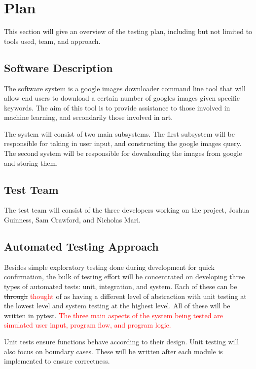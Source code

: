 \documentclass[12pt, titlepage]{article}
\begin{document}
\section{Plan} 

This section will give an overview of the testing plan, including but not limited to tools used, team, and approach.
	
\subsection{Software Description}

The software system is a google images downloader command line tool that will allow end users to download a certain number of googles images given specific keywords. The aim of this tool is to provide assistance to those involved in machine learning, and secondarily those involved in art.

The system will consist of two main subsystems. The first subsystem will be responsible for taking in user input, and constructing the google images query. The second system will be responsible for downloading the images from google and storing them. 

\subsection{Test Team}

The test team will consist of the three developers working on the project, Joshua Guinness, Sam Crawford, and Nicholas Mari.

\subsection{Automated Testing Approach}

Besides simple exploratory testing done during development for quick confirmation, the bulk of testing effort will be 
concentrated on developing three types of automated tests: unit, integration, and system. Each of these can be \sout{through} 
\textcolor{red}{thought} of as having a different level of abstraction with unit testing at the lowest level and system testing at the highest 
level. All of these will be written in pytest. \textcolor{red}{The three main aspects of the system being tested are 
simulated user input, program flow, and program logic.}

Unit tests ensure functions behave according to their design. Unit testing will also focus on boundary cases. These will be written after each module is implemented to ensure correctness.
\end{document}

